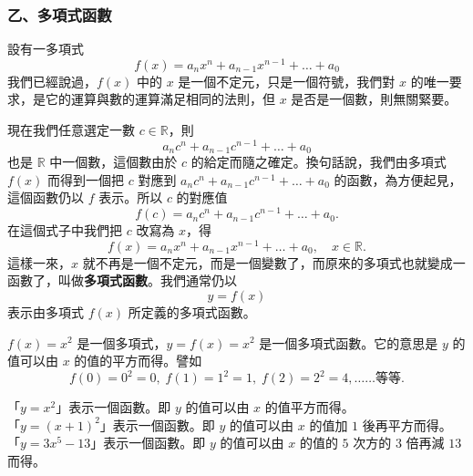 \subsubsection*{乙、多項式函數}\label{subsec:5-3-b}

設有一多項式
\begin{equation*}
  f(x) = a_n x^n + a_{n-1} x^{n-1} + \dots + a_0
\end{equation*}
我們已經說過，$f(x)$ 中的 $x$ 是一個不定元，只是一個符號，我們對 $x$ 的唯一要求，是它的運算與數的運算滿足相同的法則，但 $x$ 是否是一個數，則無關緊要。

現在我們任意選定一數 $c \in \mathbb{R}$，則
\begin{equation*}
  a_n c^n + a_{n-1} c^{n-1} + \dots + a_0
\end{equation*}
也是 $\mathbb{R}$ 中一個數，這個數由於 $c$ 的給定而隨之確定。換句話說，我們由多項式 $f(x)$ 而得到一個把 $c$ 對應到 $a_n c^n + a_{n-1} c^{n-1} + \dots + a_0$ 的函數，為方便起見，這個函數仍以 $f$ 表示。所以 $c$ 的對應值
\begin{equation*}
  f(c) = a_n c^n + a_{n-1} c^{n-1} + \dots + a_0.
\end{equation*}
在這個式子中我們把 $c$ 改寫為 $x$，得
\begin{equation*}
  f(x) = a_n x^n + a_{n-1} x^{n-1} + \dots + a_0, \quad x \in \mathbb{R}.
\end{equation*}
這樣一來，$x$ 就不再是一個不定元，而是一個變數了，而原來的多項式也就變成一函數了，叫做\textbf{多項式函數}。我們通常仍以
\begin{equation*}
  y = f(x)
\end{equation*}
表示由多項式 $f(x)$ 所定義的多項式函數。

\begin{example}\label{ex:5-3-5}
$f(x)=x^2$ 是一個多項式，$y=f(x)=x^2$ 是一個多項式函數。它的意思是 $y$ 的值可以由 $x$ 的值的平方而得。譬如
\begin{equation*}
  f(0)=0^2=0, \; f(1)=1^2=1, \; f(2)=2^2=4, \dots\dots \text{等等.}
\end{equation*}
\end{example}

\begin{example}\label{ex:5-3-6}
「$y=x^2$」表示一個函數。即 $y$ 的值可以由 $x$ 的值平方而得。\\
「$y=(x+1)^2$」表示一個函數。即 $y$ 的值可以由 $x$ 的值加 $1$ 後再平方而得。\\
「$y=3x^5-13$」表示一個函數。即 $y$ 的值可以由 $x$ 的值的 $5$ 次方的 $3$ 倍再減 $13$ 而得。
\end{example}

